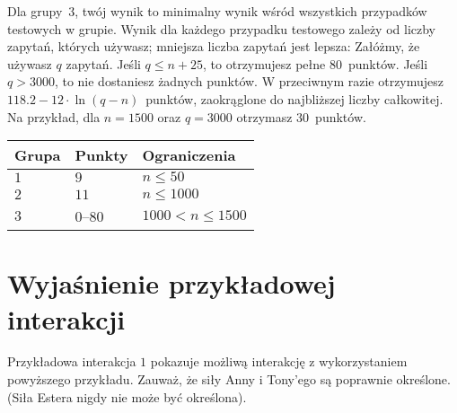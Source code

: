 Dla grupy~$3$, twój wynik to minimalny wynik wśród wszystkich przypadków testowych w grupie.
Wynik dla każdego przypadku testowego zależy od liczby zapytań, których używasz;
mniejsza liczba zapytań jest lepsza:
Załóżmy, że używasz $q$ zapytań. 
Jeśli $q \le n+25$, to otrzymujesz pełne $80$~punktów. 
Jeśli $q > 3000$, to nie dostaniesz żadnych punktów.
W przeciwnym razie otrzymujesz 
$118.2 - 12 \cdot \ln(q - n)$~punktów, zaokrąglone do najbliższej liczby całkowitej. %
Na przykład, dla $n = 1500$ oraz $q = 3000$ otrzymasz $30$~punktów.

\medskip
\begin{tabular}{lll}
Grupa & Punkty & Ograniczenia\\\hline
$1$  &  $9$ & $n\leq 50$\\
$2$  &  $11$ & $n\leq 1000$\\
$3$  &  $0$--$80$ & $1000 < n\leq 1500$\\
\end{tabular}

\section*{Wyjaśnienie przykładowej interakcji}

Przykładowa interakcja $1$ pokazuje możliwą interakcję z wykorzystaniem powyższego przykładu. 
Zauważ, że siły Anny i Tony'ego są poprawnie określone.
(Siła Estera nigdy nie może być określona).
